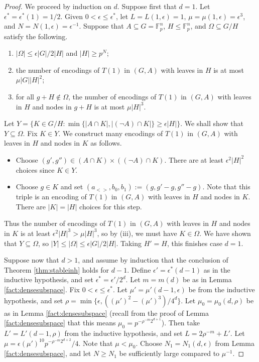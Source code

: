 \documentclass[12pt,oneside,british,a4wide]{amsart}
\numberwithin{equation}{section}
\theoremstyle{definition}
\def\F{\mathbb{F}}
\def\e{\epsilon}
\begin{document}
\begin{proof}
We proceed by induction on $d$.  Suppose first that $d=1$.  Let $\e^*=\e^*(1)=1/2$.  Given  $0<\e\leq \e^*$, let $L=L(1,\e)=1$, $\mu=\mu(1,\e)=\e^3$, and  $N=N(1,\e)=\e^{-1}$.  Suppose that $A\subseteq  G=\F_p^n$, $H\leqslant \F_p^n$, and $\Omega\subseteq G/H$ satisfy the following.
\begin{enumerate}
\item  $|\Omega|\leq \e |G|/2|H|$ and $|H|\geq p^N$;
\item the number of encodings of $T(1)$ in $(G,A)$ with leaves in $H$ is at most $\mu|G||H|^2$;
\item for all $g+H\notin \Omega$, the number of encodings of $T(1)$ in $(G,A)$ with leaves in $H$ and nodes in $g+H$ is at most $\mu|H|^{3}$. 
\end{enumerate}
  Let $Y=\{K\in G/H: \min\{|A\cap K|, |(\neg A)\cap K|\}\geq \e |H|\}$.  We shall show that $Y\subseteq \Omega$.  Fix $K\in Y$.   We construct many encodings of $T(1)$ in $(G,A)$ with leaves in $H$ and nodes in $K$ as follows.
  \begin{itemize}
\item Choose $(g',g'')\in (A\cap K)\times ((\neg A)\cap K)$.  There are at least $\e^2 |H|^2$ choices since $K\in Y$.
  \item Choose $g\in K$ and set $(a_{<>},b_0,b_1):=(g,g'-g,g''-g)$.  Note that this triple is an encoding of $T(1)$ in $(G,A)$ with leaves in $H$ and nodes in $K$.  There are $|K|=|H|$ choices for this step. 
  \end{itemize}
 Thus  the number of encodings of $T(1)$ in $(G,A)$ with leaves in $H$ and nodes in $K$ is at least $\e^2|H|^3>\mu |H|^3$, so by (iii), we must have $K\in \Omega$.  We have shown that $Y\subseteq \Omega$, so $|Y|\leq |\Omega|\leq \e |G|/2|H|$.  Taking $H'=H$, this finishes case $d=1$.

Suppose now that $d>1$, and assume by induction that the conclusion of Theorem \ref{thm:stableinh} holds for $d-1$.  Define $\e'=\e^*(d-1)$ as in the inductive hypothesis, and set $\e^*=\e'/2^d$. Let $m=m(d)$ be as in Lemma \ref{fact:densesubspace}. Fix $0<\e\leq \e^*$. Let $\mu'=\mu'(d-1,\e)$ be from the inductive hypothesis, and set $\rho=\min\{\e,((\mu')^2-(\mu')^3)/4^d\}$.  Let $\mu_0=\mu_0(d,\rho)$ be as in Lemma \ref{fact:densesubspace} (recall from the proof of Lemma \ref{fact:densesubspace} that this means $\mu_0=p^{-\rho^{-m}2^{d+1}}$).  Then take $L'=L'(d-1,\rho)$ from the inductive hypothesis, and set  $L=2\rho^{-m}+L'$.  Let $\mu=\e(\mu')^{10}p^{-\rho^{-m}2^{d+2}}/4$.  Note that $\mu< \mu_0$.  Choose $N_1=N_1(d,\e)$ from Lemma \ref{fact:densesubspace}, and let $N\geq N_1$ be sufficiently large compared to $\mu^{-1}$.


\end{proof}
\end{document}
